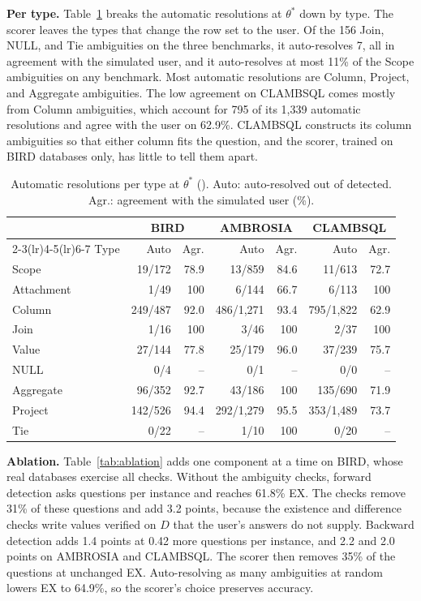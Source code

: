 \textbf{Per type.} Table~\ref{tab:pertype} breaks the automatic
resolutions at $\theta^{*}$ down by type. The scorer leaves the types
that change the row set to the user. Of the 156 Join, NULL, and Tie
ambiguities on the three benchmarks, it auto-resolves 7, all in
agreement with the simulated user, and it auto-resolves at most 11\%
of the Scope ambiguities on any benchmark. Most automatic resolutions
are Column, Project, and Aggregate ambiguities. The low agreement on
CLAMBSQL comes mostly from Column ambiguities, which account for 795
of its 1{,}339 automatic resolutions and agree with the user on
62.9\%. CLAMBSQL constructs its column
ambiguities so that either column fits the question, and the scorer,
trained on BIRD databases only, has little to tell them apart.

\begin{table}[t]
\centering
\caption{Automatic resolutions per type at $\theta^{*}$ (\coder). Auto: auto-resolved out of detected. Agr.: agreement with the simulated user (\%).}
\label{tab:pertype}
\footnotesize
\setlength{\tabcolsep}{3pt}
\begin{tabular}{@{}lrrrrrr@{}}
\toprule
& \multicolumn{2}{c}{BIRD} & \multicolumn{2}{c}{AMBROSIA} &
\multicolumn{2}{c}{CLAMBSQL} \\
\cmidrule(lr){2-3}\cmidrule(lr){4-5}\cmidrule(lr){6-7}
Type & Auto & Agr. & Auto & Agr. & Auto & Agr. \\
\midrule
Scope & 19/172 & 78.9 & 13/859 & 84.6 & 11/613 & 72.7 \\
Attachment & 1/49 & 100 & 6/144 & 66.7 & 6/113 & 100 \\
Column & 249/487 & 92.0 & 486/1{,}271 & 93.4 & 795/1{,}822 & 62.9 \\
Join & 1/16 & 100 & 3/46 & 100 & 2/37 & 100 \\
Value & 27/144 & 77.8 & 25/179 & 96.0 & 37/239 & 75.7 \\
NULL & 0/4 & -- & 0/1 & -- & 0/0 & -- \\
Aggregate & 96/352 & 92.7 & 43/186 & 100 & 135/690 & 71.9 \\
Project & 142/526 & 94.4 & 292/1{,}279 & 95.5 & 353/1{,}489 & 73.7 \\
Tie & 0/22 & -- & 1/10 & 100 & 0/20 & -- \\
\bottomrule
\end{tabular}
\end{table}

\textbf{Ablation.}\label{sec:exp-rq3} Table~\ref{tab:ablation} adds one component at a
time on BIRD, whose real databases exercise all checks.
 Without the
ambiguity checks, forward detection asks \abAblQFwdNoCheck{} questions
per instance and reaches 61.8\% EX. The checks remove 31\% of these
questions and add 3.2 points, because the
existence and difference checks write values verified on $D$ that
the user's answers do not supply. Backward detection adds 1.4
points at 0.42 more questions per instance, and 2.2 and 2.0 points on
AMBROSIA and CLAMBSQL. The scorer then removes 35\% of the
questions at unchanged EX. Auto-resolving as many ambiguities at random
lowers EX to 64.9\%, so the scorer's choice
preserves accuracy.

